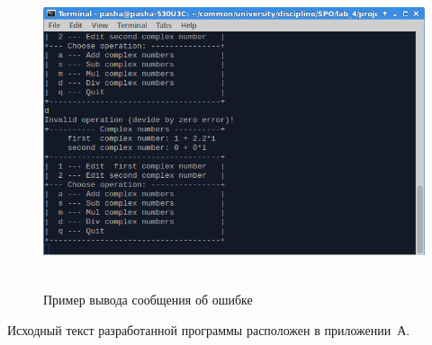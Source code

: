 \begin{figure}[htbp]
  \centering
  \includegraphics[width=150mm,height=92mm]{img/error}
  \caption{Пример вывода сообщения об ошибке}\label{fig:error}
\end{figure}

Исходный текст разработанной программы расположен в приложении~А.

\newpage